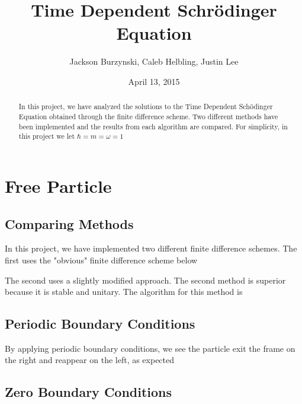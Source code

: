 \documentclass{article}
\begin{document}
\title{Time Dependent Schr\"{o}dinger Equation}
\author{Jackson Burzynski, Caleb Helbling, Justin Lee}
\date{April 13, 2015}

\maketitle

\begin{abstract}

In this project, we have analyzed the solutions to the Time Dependent Sch\"{o}dinger Equation obtained through the finite difference scheme. Two different methods have been implemented and the results from each algorithm are compared. For simplicity, in this project we let $\hbar = m = \omega = 1$

\end{abstract}

\section{Free Particle}

\subsection{Comparing Methods}

In this project, we have implemented two different finite difference schemes. The first uses the "obvious" finite difference scheme below

The second uses a slightly modified approach. The second method is superior because it is stable and unitary. The algorithm for this method is

%

\subsection{Periodic Boundary Conditions}

By applying periodic boundary conditions, we see the particle exit the frame on the right and reappear on the left, as expected

\subsection{Zero Boundary Conditions}
\end{document}
